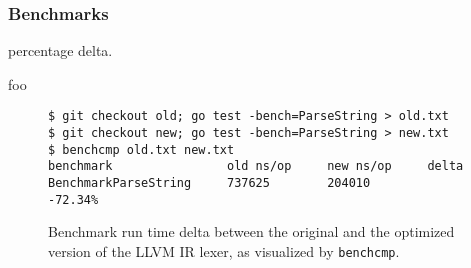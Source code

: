 
\subsubsection{Benchmarks}

percentage delta.

foo

\begin{figure}[htbp]
	\begin{center}
		\begin{verbatim}
$ git checkout old; go test -bench=ParseString > old.txt
$ git checkout new; go test -bench=ParseString > new.txt
$ benchcmp old.txt new.txt
benchmark                old ns/op     new ns/op     delta
BenchmarkParseString     737625        204010        -72.34%
		\end{verbatim}
		\caption{Benchmark run time delta between the original and the optimized version of the LLVM IR lexer, as visualized by \texttt{benchcmp}\protect\footnotemark.}
		\label{fig:benchmark_delta}
	\end{center}
\end{figure}
